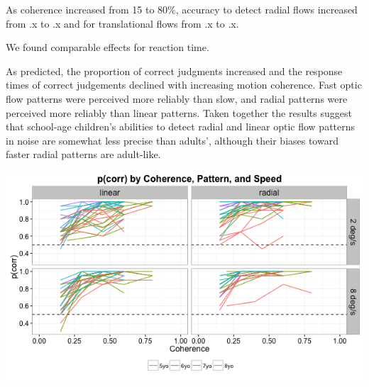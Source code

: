 \documentclass[landscape,final,paperwidth=60in,paperheight=41.5in,fontscale=0.285]{baposter}
\begin{document}
\begin{poster}
{As coherence increased from 15 to 80\%, accuracy to detect radial flows increased from .x to .x and for translational flows from .x to .x.

We found comparable effects for reaction time.
 
As predicted, the proportion of correct judgments increased and the response times of correct judgements declined with increasing motion coherence. Fast optic flow patterns were perceived more reliably than slow, and radial patterns were perceived more reliably than linear patterns. Taken together the results suggest that school-age children's abilities to detect radial and linear optic flow patterns in noise are somewhat less precise than adults', although their biases toward faster radial patterns are adult-like.

\begin{center}
  \includegraphics[scale=0.7,valign=t]{img/p-corr-plot-1.png}


\end{center}}
\end{poster}
\end{document}
